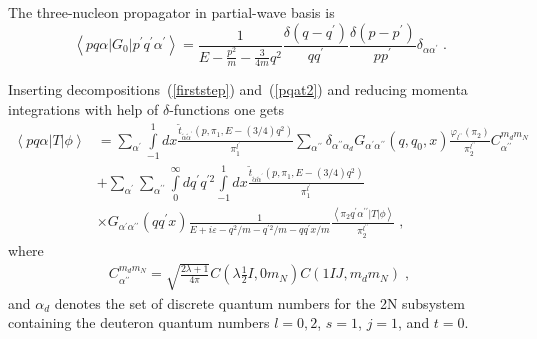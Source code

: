 The three-nucleon propagator in partial-wave basis is
\begin{equation}
\left<pq\alpha|G_{0}|p^{\prime}q^{\prime}\alpha^{\prime}\right> = \frac{1}{E - \frac{p^{2}}{m} - \frac{3}{4m}q^{2}}\frac{\delta (q - q^{\prime})}{qq^{\prime}}\frac{\delta (p - p^{\prime})}{pp^{\prime}}\delta_{\alpha\alpha^{\prime}}\;.
\end{equation}

Inserting decompositions~(\ref{firststep}) and~(\ref{pqat2}) and reducing  momenta integrations with help of $\delta$-functions one gets
\begin{equation}
\begin{split}
\left<pq\alpha|T|\phi\right> &= \sum\limits_{\alpha^{\prime}}\int\limits_{-1}^{1}dx\frac{\tilde{t}_{\tilde{\alpha}\tilde{\alpha}^{\prime}}(p,\pi_{1},E-(3/4)q^{2})}{\pi^{l^{\prime}}_{1}}\sum\limits_{\alpha^{\prime\prime}}\delta_{\alpha^{\prime\prime}\alpha_{d}}G_{\alpha^{\prime}\alpha^{\prime\prime}}(q,q_{0},x)\frac{\varphi_{l^{\prime\prime}}(\pi_{2})}{\pi^{l^{\prime\prime}}_{2}}C^{m_{d}m_{N}}_{\alpha^{\prime\prime}} \\&+ \sum\limits_{\alpha^{\prime}}\sum\limits_{\alpha^{\prime\prime}}\int\limits_{0}^{\infty}dq^{\prime}q^{\prime 2}\int\limits_{-1}^{1}dx\frac{\tilde{t}_{\tilde{\alpha}\tilde{\alpha}^{\prime}}(p,\pi_{1},E-(3/4)q^{2})}{\pi^{l^{\prime}}_{1}}\\
&\times G_{\alpha^{\prime}\alpha^{\prime\prime}}(qq^{\prime}x)\frac{1}{E + i\varepsilon - q^{2}/m - q^{\prime 2}/m - qq^{\prime}x/m}\frac{\left<\pi_{2}q^{\prime}\alpha^{\prime\prime}|T|\phi\right>}{\pi^{l^{\prime\prime}}_{2}}\;,
\end{split}
\label{eqF1}
\end{equation}
where
\begin{equation}
\begin{split}
C^{m_{d}m_{N}}_{\alpha^{\prime\prime}} = \sqrt{\frac{2\lambda + 1}{4\pi}}C\left(\lambda\frac{1}{2}I,0m_{N}\right)C\left(1IJ,m_{d}m_{N}\right)\;,
\label{eqF12}
\end{split}
\end{equation}
and $\alpha_{d}$ denotes the set of discrete quantum numbers for the 2N subsystem containing the deuteron quantum numbers $l = 0, 2$, $s = 1$, $j = 1$, and $t = 0$.

